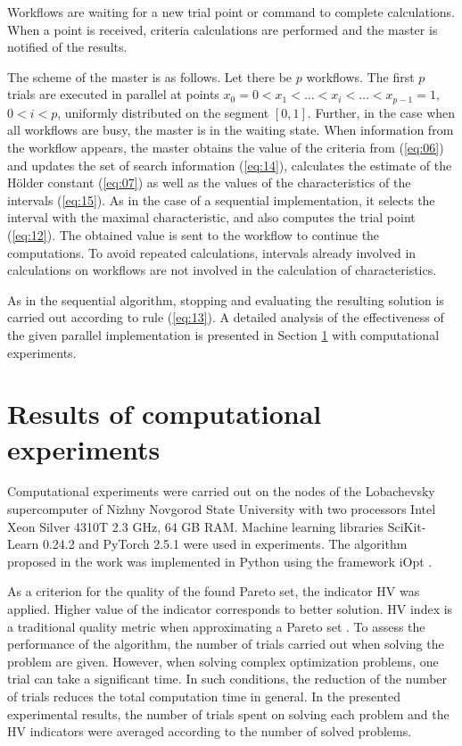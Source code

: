 \documentclass[runningheads]{llncs}
\begin{document}
Workflows are waiting for a new trial point or command to complete calculations. When a point is received, criteria calculations are performed and the master is notified of the results. 

The scheme of the master is as follows. Let there be $p$ workflows. The first $p$ trials are executed in parallel at points $x_0=0<x_1<\dots<x_i<\dots<x_{p-1}=1$, $0<i<p$, uniformly distributed on the segment $[0,1]$. Further, in the case when all workflows are busy, the master is in the waiting state. When information from the workflow appears, the master obtains the value of the criteria from (\ref{eq:06}) and updates the set of search information (\ref{eq:14}), calculates the estimate of the H{\" o}lder constant (\ref{eq:07}) as well as the values of the characteristics of the intervals (\ref{eq:15}). As in the case of a sequential implementation, it selects the interval with the maximal characteristic, and also computes the trial point (\ref{eq:12}). The obtained value is sent to the workflow to continue the computations. To avoid repeated calculations, intervals already involved in calculations on workflows are not involved in the calculation of characteristics.

As in the sequential algorithm, stopping and evaluating the resulting solution is carried out according to rule (\ref{eq:13}). A detailed analysis of the effectiveness of the given parallel implementation is presented in Section \ref{sec4} with computational experiments.


\section{Results of computational experiments}
\label{sec4}

Computational experiments were carried out on the nodes of the Lobachevsky supercomputer of Nizhny Novgorod State University with two processors Intel Xeon Silver 4310T 2.3 GHz, 64 GB RAM. Machine learning libraries SciKit-Learn 0.24.2 \cite{scikit-learn} and PyTorch 2.5.1 \cite{PyTorch} were used in experiments. The algorithm proposed in the work was implemented in Python using the framework iOpt \cite{ioptmco}.

As a criterion for the quality of the found Pareto set, the indicator HV was applied. Higher value of the indicator corresponds to better solution. 
HV index is a traditional quality metric when approximating a Pareto set \cite{Evtushenko2014,pymoo,AGP_ML}.
To assess the performance of the algorithm, the number of trials carried out when solving the problem are given. However, when solving complex optimization problems, one trial can take a significant time. In such conditions, the reduction of the number of trials reduces the total computation time in general. In the presented experimental results, the number of trials spent on solving each problem and the HV indicators were averaged according to the number of solved problems.
\end{document}
